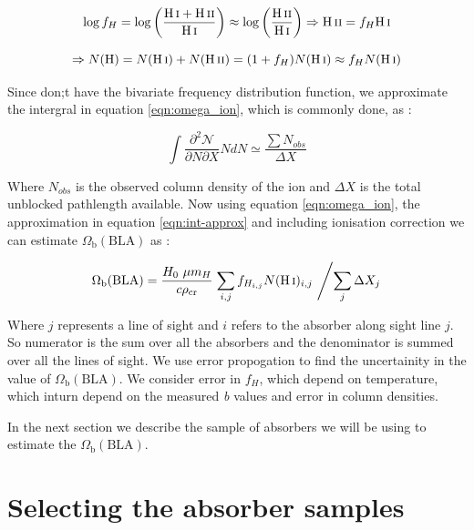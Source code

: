 \begin{equation*}
     \log f_H = \log \left(\frac{\ion{H}{i}+\ion{H}{ii}}{\ion{H}{i}}\right) \approx \log \left(\frac{\ion{H}{ii}}{\ion{H}{i}}\right)  \Rightarrow  \ion{H}{ii}= f_H \ion{H}{i}
\end{equation*}

\begin{equation*}
     \Rightarrow  N(\text{H}) = N(\ion{H}{i})+N(\ion{H}{ii}) = (1+f_H)N(\ion{H}{i}) \approx f_H N(\ion{H}{i})
\end{equation*}

Since don;t have the bivariate frequency distribution function, we approximate the intergral in equation \ref{eqn:omega_ion}, which is commonly done, as : 

\begin{equation} \label{eqn:int-approx}
    \int \frac{\partial ^2 \mathcal{N}}{\partial N  \partial X} N dN \simeq \frac{\sum N_{obs}}{\Delta X} 
\end{equation}

Where $N_{obs}$ is the observed column density of the ion and $\Delta X$ is the total unblocked pathlength available. Now using equation \ref{eqn:omega_ion}, the approximation in equation \ref{eqn:int-approx} and including ionisation correction we can estimate $\Omega_\text{b}(\text{BLA})$ as :

\begin{equation}
    \Omega_\text{b}(\text{BLA}) = \frac{H_0 \ \mu m_H}{c \rho_{\text{cr}}} \left. \sum_{i,j} f_{H_{i,j}} N(\ion{H}{i})_{i,j} \ \middle / \sum_j \Delta X_j \right.
\end{equation}

Where $j$ represents a line of sight and $i$ refers to the absorber along sight line $j$. So numerator is the sum over all the absorbers and the denominator is summed over all the lines of sight.  We use error propogation to find the uncertainity in the value of $\Omega_\text{b}(\text{BLA})$. We consider error in $f_H$, which depend on temperature, which inturn depend on the measured \emph{b} values and error in  column densities.  

In the next section we describe the sample of absorbers we will be using to estimate the $\Omega_\text{b}(\text{BLA})$.

\section{Selecting the absorber samples}  \label{sec:BLA-sample}

